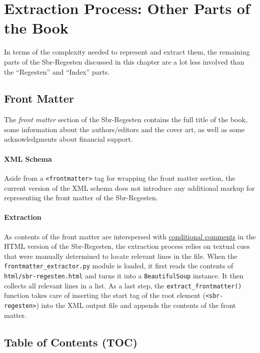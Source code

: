 \section{Extraction Process: Other Parts of the Book}
\label{sec:other}

In terms of the complexity needed to represent and extract them, the
remaining parts of the Sbr-Regesten discussed in this chapter are a
lot less involved than the ``Regesten'' and ``Index'' parts.

\subsection{Front Matter}
\label{sec:frontmatter}

The \emph{front matter} section of the Sbr-Regesten contains the full
title of the book, some information about the authors/editors and the
cover art, as well as some acknowledgments about financial support.

\paragraph{XML Schema}

Aside from a \texttt{<frontmatter>} tag for wrapping the front matter
section, the current version of the XML schema does not introduce any
additional markup for representing the front matter of the
Sbr-Regesten.

\paragraph{Extraction}

As contents of the front matter are interspersed with
\href{https://en.wikipedia.org/wiki/Conditional_comment}{conditional
  comments} in the HTML version of the Sbr-Regesten, the extraction
process relies on textual cues that were manually determined to locate
relevant lines in the file. When the
\texttt{frontmatter\_extractor.py} module is loaded, it first reads
the contents of \texttt{html/sbr-regesten.html} and turns it into a
\texttt{BeautifulSoup} instance. It then collects all relevant lines
in a list. As a last step, the \texttt{extract\_frontmatter()}
function takes care of inserting the start tag of the root element
(\texttt{<sbr-regesten>}) into the XML output file and appends the
contents of the front matter.

\subsection{Table of Contents (TOC)}
\label{sec:toc}

